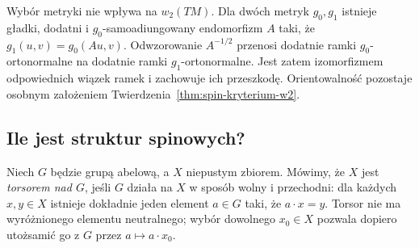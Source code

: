 Wybór metryki nie wpływa na $w_2(TM)$.
Dla dwóch metryk $g_0,g_1$ istnieje gładki,
dodatni i $g_0$-samoadiungowany endomorfizm $A$
taki, że $g_1(u,v)=g_0(Au,v)$.
Odwzorowanie $A^{-1/2}$ przenosi dodatnie
ramki $g_0$-ortonormalne na dodatnie ramki
$g_1$-ortonormalne. Jest zatem izomorfizmem
odpowiednich wiązek ramek i zachowuje ich przeszkodę.
Orientowalność pozostaje osobnym założeniem
Twierdzenia~\ref{thm:spin-kryterium-w2}.
\subsection{Ile jest struktur spinowych?}

\begin{definicja}[Torsor]
\label{def:spin-torsor}
Niech $G$ będzie grupą abelową, a $X$ niepustym zbiorem.
Mówimy, że $X$ jest \emph{torsorem nad $G$},
jeśli $G$ działa na $X$ w sposób wolny i przechodni:
dla każdych $x,y\in X$ istnieje dokładnie jeden
element $a\in G$ taki, że $a\cdot x=y$.
Torsor nie ma wyróżnionego elementu neutralnego;
wybór dowolnego $x_0\in X$ pozwala dopiero
utożsamić go z $G$ przez $a\mapsto a\cdot x_0$.
\end{definicja}

